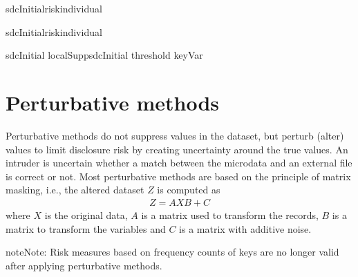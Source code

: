 \documentclass[letterpaper,10pt,english]{sphinxmanual}
\begin{document}
\def\sphinxLiteralBlockLabel{\label{\detokenize{anon_methods:code511}}}
%
\begin{sphinxVerbatim}[commandchars=\\\{\},numbers=left,firstnumber=1,stepnumber=1]
 sdcInitialriskindividual\PYG{p}{[}\PYG{p}{]}

 sdcInitialriskindividual\PYG{p}{[}\PYG{p}{]}  

 sdcInitial  localSuppsdcInitial threshold   keyVar  
\end{sphinxVerbatim}


\section{Perturbative methods}
\label{\detokenize{anon_methods:perturbative-methods}}
Perturbative methods do not suppress values in the dataset, but perturb
(alter) values to limit disclosure risk by creating uncertainty around
the true values. An intruder is uncertain whether a match between the
microdata and an external file is correct or not. Most perturbative
methods are based on the principle of matrix masking, i.e., the altered
dataset \(Z\) is computed as
\begin{equation*}
\begin{split}Z = AXB + C\end{split}
\end{equation*}
where \(X\) is the original data, \(A\) is a matrix used to transform the
records, \(B\) is a matrix to transform the variables and \(C\) is a matrix with
additive noise.

\begin{sphinxadmonition}{note}{Note:}
Risk measures based on frequency counts of keys are no longer
valid after applying perturbative methods.
\end{sphinxadmonition}
\end{document}
